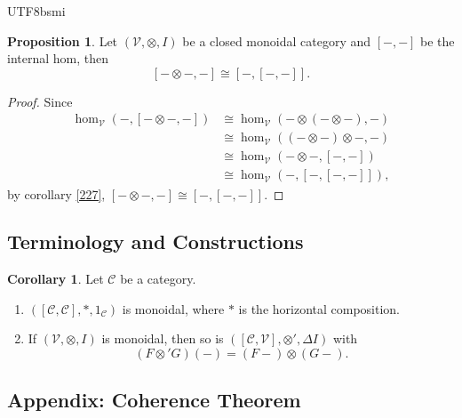 \documentclass[12pt]{article}
\theoremstyle{definition}
\newtheorem{property}[definition]{Proposition}
\newtheorem{corollary}[definition]{Corollary}
\newcommand\<{\langle}
\renewcommand\>{\rangle}
\begin{document}
\begin{CJK}{UTF8}{bsmi}
\begin{property}
    Let $(\mathcal{V}, \otimes, I)$ be a closed monoidal category and $[-, -]$ be the internal hom, then
    \[
        [-\otimes-, -] \cong [-, [-, -]].
    \]
\end{property}
\begin{proof}
    Since
    \begin{align*}
        \hom_\mathcal{V}(-, [-\otimes-, -])
        & \cong \hom_\mathcal{V}(-\otimes(-\otimes-), -) \\
        & \cong \hom_\mathcal{V}((-\otimes-)\otimes-, -) \\
        & \cong \hom_\mathcal{V}(-\otimes-, [-, -]) \\
        & \cong \hom_\mathcal{V}(-, [-, [-, -]]),
    \end{align*}
    by corollary \ref{227}, $[-\otimes-, -] \cong [-, [-, -]]$.
\end{proof}

\subsection{Terminology and Constructions}

\begin{corollary}
    Let $\mathcal{C}$ be a category.
    \begin{enumerate}
        \item $([\mathcal{C}, \mathcal{C}], *, 1_\mathcal{C})$ is monoidal, where $*$ is the horizontal composition.
        \item If $(\mathcal{V}, \otimes, I)$ is monoidal, then so is $([\mathcal{C}, \mathcal{V}], \otimes', \Delta I)$ with
        \[
            (F\otimes' G)(-) = (F-)\otimes(G-).
        \]
    \end{enumerate}
\end{corollary}

\subsection{Appendix: Coherence Theorem}


\end{CJK}
\end{document}
